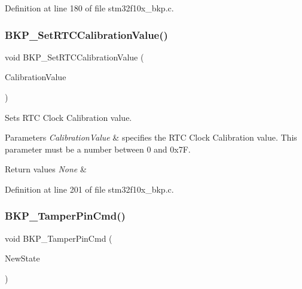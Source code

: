Definition at line 180 of file stm32f10x\+\_\+bkp.\+c.

\mbox{\label{group___b_k_p___private___functions_gad34db08a944450d2e7d56d0fd8db2bca}} 
\subsubsection{\texorpdfstring{B\+K\+P\+\_\+\+Set\+R\+T\+C\+Calibration\+Value()}{BKP\_SetRTCCalibrationValue()}}
{\footnotesize\ttfamily void B\+K\+P\+\_\+\+Set\+R\+T\+C\+Calibration\+Value (\begin{DoxyParamCaption}\item[{uint8\+\_\+t}]{Calibration\+Value }\end{DoxyParamCaption})}



Sets R\+TC Clock Calibration value. 


\begin{DoxyParams}{Parameters}
{\em Calibration\+Value} & specifies the R\+TC Clock Calibration value. This parameter must be a number between 0 and 0x7F. \\
\hline
\end{DoxyParams}

\begin{DoxyRetVals}{Return values}
{\em None} & \\
\hline
\end{DoxyRetVals}


Definition at line 201 of file stm32f10x\+\_\+bkp.\+c.

\mbox{\label{group___b_k_p___private___functions_ga3a0cdff9ad8238ade2c67e2b70f530ac}} 
\subsubsection{\texorpdfstring{B\+K\+P\+\_\+\+Tamper\+Pin\+Cmd()}{BKP\_TamperPinCmd()}}
{\footnotesize\ttfamily void B\+K\+P\+\_\+\+Tamper\+Pin\+Cmd (\begin{DoxyParamCaption}\item[{\hyperlink{group___exported__types_gac9a7e9a35d2513ec15c3b537aaa4fba1}{Functional\+State}}]{New\+State }\end{DoxyParamCaption})}



